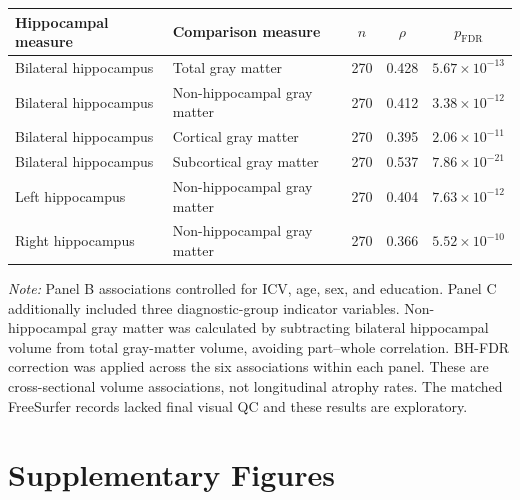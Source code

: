 \documentclass{article}
\begin{document}
\begin{table}[!htbp]
\vspace{1mm}
\begin{tabular}{@{}>{\raggedright\arraybackslash}p{4.0cm}>{\raggedright\arraybackslash}p{4.3cm}ccc@{}}
\toprule
\textbf{Hippocampal measure} & \textbf{Comparison measure} & \textbf{\(n\)} & \textbf{\(\rho\)} & \textbf{\(p_{\mathrm{FDR}}\)}\\
\midrule
Bilateral hippocampus & Total gray matter & 270 & 0.428 & \(5.67\times10^{-13}\) \\
Bilateral hippocampus & Non-hippocampal gray matter & 270 & 0.412 & \(3.38\times10^{-12}\) \\
Bilateral hippocampus & Cortical gray matter & 270 & 0.395 & \(2.06\times10^{-11}\) \\
Bilateral hippocampus & Subcortical gray matter & 270 & 0.537 & \(7.86\times10^{-21}\) \\
Left hippocampus & Non-hippocampal gray matter & 270 & 0.404 & \(7.63\times10^{-12}\) \\
Right hippocampus & Non-hippocampal gray matter & 270 & 0.366 & \(5.52\times10^{-10}\) \\
\bottomrule
\end{tabular}

\vspace{1mm}
\footnotesize{\textit{Note:} Panel B associations controlled for ICV, age, sex, and education. Panel C additionally included three diagnostic-group indicator variables. Non-hippocampal gray matter was calculated by subtracting bilateral hippocampal volume from total gray-matter volume, avoiding part--whole correlation. BH-FDR correction was applied across the six associations within each panel. These are cross-sectional volume associations, not longitudinal atrophy rates. The matched FreeSurfer records lacked final visual QC and these results are exploratory.}

\end{table}

\FloatBarrier

\section{Supplementary Figures}
\end{document}
